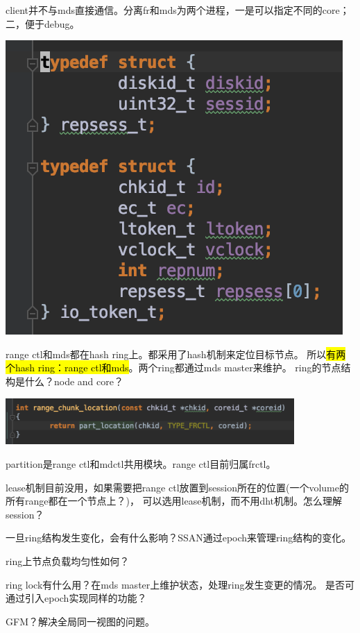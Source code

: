 client并不与mds直接通信。分离fr和mds为两个进程，一是可以指定不同的core；二，便于debug。

\begin{center}
\includegraphics{../imgs/token.png}
\end{center}

range ctl和mds都在hash ring上。都采用了hash机制来定位目标节点。
所以\hl{有两个hash ring：range ctl和mds}。两个ring都通过mds master来维护。
ring的节点结构是什么？node and core？
\begin{center}
\includegraphics[width=11cm]{../imgs/chunk-location.png}
\end{center}

partition是range ctl和mdctl共用模块。range ctl目前归属frctl。

lease机制目前没用，如果需要把range ctl放置到session所在的位置(一个volume的所有range都在一个节点上？)，
可以选用lease机制，而不用dht机制。怎么理解session？

一旦ring结构发生变化，会有什么影响？SSAN通过epoch来管理ring结构的变化。

ring上节点负载均匀性如何？

ring lock有什么用？在mds master上维护状态，处理ring发生变更的情况。
是否可通过引入epoch实现同样的功能？

GFM？解决全局同一视图的问题。

